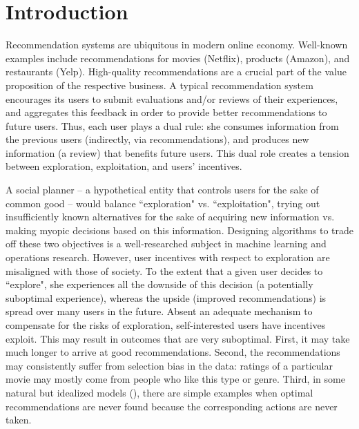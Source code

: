 \pagebreak
\section{Introduction}

Recommendation systems are ubiquitous in modern online economy. Well-known examples include recommendations for movies (\eg  Netflix), products (\eg  Amazon), and restaurants (\eg  Yelp).
High-quality recommendations are a crucial part of the value proposition of the respective business.
%
A typical recommendation system encourages its users to submit evaluations and/or reviews of their experiences, and aggregates this feedback in order to provide better recommendations to future users. Thus, each user plays a dual rule: she consumes information from the previous users (indirectly, via recommendations),
and produces new information (\eg  a review) that benefits future users. This dual role creates a tension between exploration, exploitation, and users' incentives.

A social planner -- a hypothetical entity that controls users for the sake of common good -- would balance ``exploration" vs.  ``exploitation", \ie  trying out insufficiently known alternatives for the sake of acquiring new information vs. making myopic decisions based on this information. Designing algorithms to trade off these two objectives is a well-researched subject in machine learning and operations research.
%
However, user incentives with respect to exploration are misaligned with those of society. To the extent that a given user decides to ``explore", she experiences all the downside of this decision (a potentially suboptimal experience), whereas the upside (improved recommendations) is spread over many users in the future. Absent an adequate mechanism to compensate for the risks of exploration, self-interested users have incentives exploit. This may result in outcomes that are very suboptimal. First, it may take much longer to arrive at good recommendations. Second, the recommendations may consistently suffer from selection bias in the data: \eg  ratings of a particular movie may mostly come from people who like this type or genre. Third, in some natural but idealized models (\eg  \cite{Kremer-JPE14,ICexploration-ec15}), there are simple  examples when optimal recommendations are never found because the corresponding actions are never taken.

